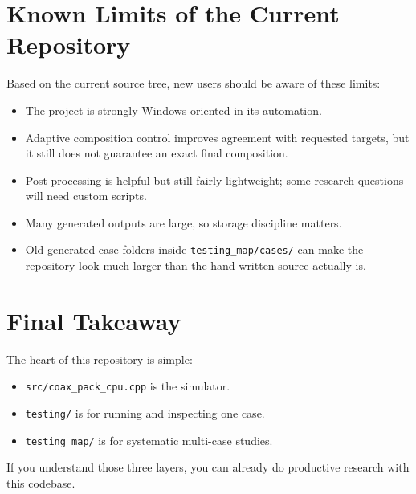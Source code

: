 \documentclass[11pt]{article}
\begin{document}
\section{Known Limits of the Current Repository}

Based on the current source tree, new users should be aware of these limits:
\begin{itemize}
  \item The project is strongly Windows-oriented in its automation.
  \item Adaptive composition control improves agreement with requested targets, but it still does not guarantee an exact final composition.
  \item Post-processing is helpful but still fairly lightweight; some research questions will need custom scripts.
  \item Many generated outputs are large, so storage discipline matters.
  \item Old generated case folders inside \texttt{testing\_map/cases/} can make the repository look much larger than the hand-written source actually is.
\end{itemize}

\section{Final Takeaway}

The heart of this repository is simple:
\begin{itemize}
  \item \texttt{src/coax\_pack\_cpu.cpp} is the simulator.
  \item \texttt{testing/} is for running and inspecting one case.
  \item \texttt{testing\_map/} is for systematic multi-case studies.
\end{itemize}

If you understand those three layers, you can already do productive research with this codebase.
\end{document}

